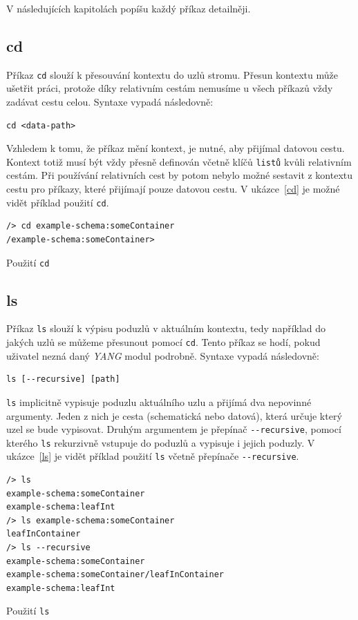 \documentclass[thesis=B,czech,hidelinks]{FITthesis}[2019/03/06]
\begin{document}
V následujících kapitolách popíšu každý příkaz detailněji.

\subsection{cd}
Příkaz \texttt{cd} slouží k přesouvání kontextu do uzlů stromu. Přesun kontextu může ušetřit práci, protože díky relativním cestám nemusíme u všech příkazů vždy zadávat cestu celou. Syntaxe vypadá následovně:
\begin{verbatim}
cd <data-path>
\end{verbatim}
Vzhledem k tomu, že příkaz mění kontext, je nutné, aby přijímal datovou cestu. Kontext totiž musí být vždy přesně definován včetně klíčů \texttt{listů} kvůli relativním cestám. Při používání relativních cest by potom nebylo možné sestavit z kontextu cestu pro příkazy, které přijímají pouze datovou cestu. V ukázce~\ref{cd} je možné vidět příklad použití \texttt{cd}.

\begin{listing}
\begin{verbatim}
/> cd example-schema:someContainer
/example-schema:someContainer>
\end{verbatim}
\caption{Použití \texttt{cd}}\label{cd}
\end{listing}

\subsection{ls}
Příkaz \texttt{ls} slouží k výpisu poduzlů v aktuálním kontextu, tedy například do jakých uzlů se můžeme přesunout pomocí \texttt{cd}. Tento příkaz se hodí, pokud uživatel nezná daný \textit{YANG} modul podrobně. Syntaxe vypadá následovně:
\begin{verbatim}
ls [--recursive] [path]
\end{verbatim}
\texttt{ls} implicitně vypisuje poduzlu aktuálního uzlu a přijímá dva nepovinné argumenty. Jeden z nich je cesta (schematická nebo datová), která určuje který uzel se bude vypisovat. Druhým argumentem je přepínač \verb¨--recursive¨, pomocí kterého \texttt{ls} rekurzivně vstupuje do poduzlů a vypisuje i jejich poduzly. V ukázce~\ref{ls} je vidět příklad použití \texttt{ls} včetně přepínače \verb¨--recursive¨.

\begin{listing}
\begin{verbatim}
/> ls
example-schema:someContainer
example-schema:leafInt
/> ls example-schema:someContainer
leafInContainer
/> ls --recursive
example-schema:someContainer
example-schema:someContainer/leafInContainer
example-schema:leafInt
\end{verbatim}
\caption{Použití \texttt{ls}}\label{ls}
\end{listing}
\end{document}
